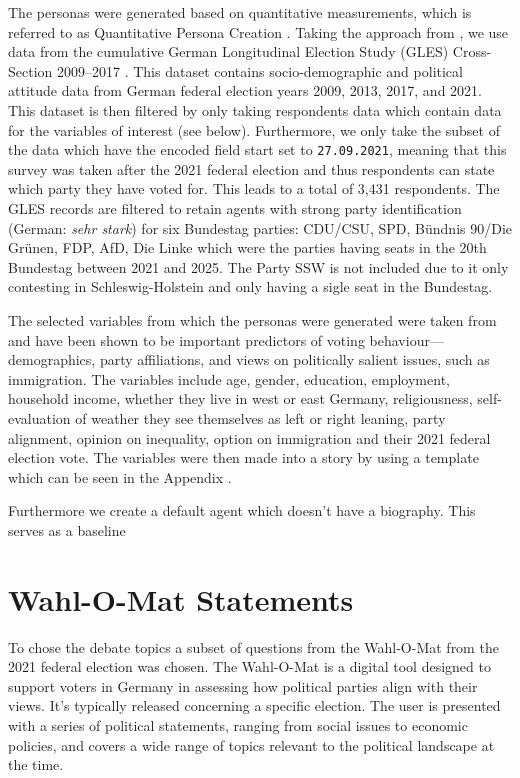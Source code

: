 The personas were generated based on quantitative measurements, which is referred to as Quantitative Persona Creation \cite{Salminen2020quantative}. Taking the approach from \cite{von2024vox}, we use data from the cumulative German Longitudinal Election Study (GLES) Cross-Section 2009–2017 \citep{ZA6835}. This dataset contains socio-demographic and political attitude data from German federal election years 2009, 2013, 2017, and 2021. This dataset  is then filtered by only taking respondents data which contain data for the variables of interest (see below). Furthermore, we only take the subset of the data which have the encoded field start set to \texttt{27.09.2021}, meaning that this survey was taken after the 2021 federal election and thus respondents can state which party they have voted for. This leads to a total of 3,431 respondents. The GLES records are filtered to retain agents with strong party identification (German: \emph{sehr stark}) for six Bundestag parties: CDU/CSU, SPD, Bündnis 90/Die Grünen, FDP, AfD, Die Linke which were the parties having seats in the 20th Bundestag between 2021 and 2025. The Party SSW is not included due to it only contesting in Schleswig-Holstein and only having a sigle seat in the Bundestag. 

The selected variables from which the personas were generated were taken from \cite{von2024vox} and have been shown to be important predictors of voting behaviour—demographics, party affiliations, and views on politically salient issues, such as immigration. The variables include age, gender, education, employment, household income, whether they live in west or east Germany, religiousness, self-evaluation of weather they see themselves as left or right leaning, party alignment, opinion on inequality, option on immigration and their 2021 federal election vote. The variables were then made into a story by using a template which can be seen in the Appendix .

Furthermore we create a default agent which doesn't have a biography. This serves as a baseline  

\section{Wahl-O-Mat Statements}

To chose the debate topics a subset of questions from the Wahl-O-Mat from the 2021 federal election was chosen. The Wahl-O-Mat is a digital tool designed to support voters in Germany in assessing how political parties align with their views. It’s typically released concerning a specific election. The user is presented with a series of political statements, ranging from social issues to economic policies, and covers a wide range of topics relevant to the political landscape at the time.



